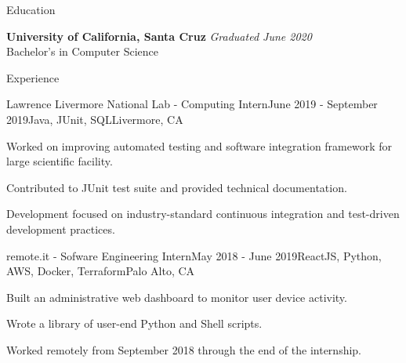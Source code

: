 \documentclass{resume} %
\begin{document}

\begin{rSection}{Education}

    {\bf University of California, Santa Cruz} \hfill {\em Graduated June 2020} \\ 
    Bachelor's in Computer Science

\end{rSection}




\begin{rSection}{Experience}
    \begin{rSubsection}{Lawrence Livermore National Lab - Computing Intern}{June 2019 - September 2019}{Java, JUnit, SQL}{Livermore, CA}
        \item Worked on improving automated testing and software integration framework for large scientific facility.
        \item Contributed to JUnit test suite and provided technical documentation.
        \item Development focused on industry-standard continuous integration and test-driven development practices.
    \end{rSubsection}

    \begin{rSubsection}{remote.it - Sofware Engineering Intern}{May 2018 - June 2019}{ReactJS, Python, AWS, Docker, Terraform}{Palo Alto, CA}
        \item Built an administrative web dashboard to monitor user device activity.
        \item Wrote a library of user-end Python and Shell scripts.
        \item Worked remotely from September 2018 through the end of the internship.
    \end{rSubsection}

\end{rSection}

\end{document}
